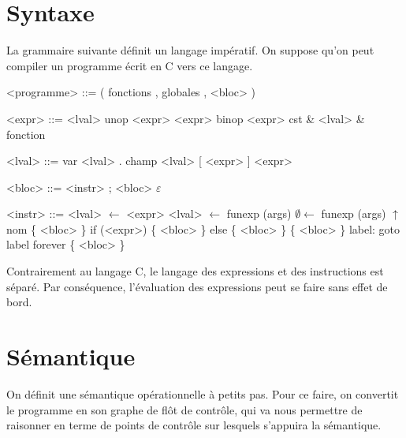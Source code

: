 \documentclass{article}
\begin{document}
\section{Syntaxe}

La grammaire suivante définit un langage impératif. On suppose qu'on peut
compiler un programme écrit en C vers ce langage.

\begin{grammarf}
<programme> ::= ( fonctions , globales , <bloc> )
\end{grammarf}
\begin{minipage}{0.4\textwidth}
\begin{grammarf}
    <expr> ::= <lval>
          \alt unop <expr>
          \alt <expr> binop <expr>
          \alt cst
          \alt \& <lval>
          \alt \& fonction

    <lval> ::= var
          \alt <lval> . champ
          \alt <lval> [ <expr> ]
          \alt * <expr>
\end{grammarf}
\end{minipage}
\begin{minipage}{0.4\textwidth}
\begin{grammarf}
     <bloc> ::= <instr> ; <bloc>
           \alt $ε$

    <instr> ::= <lval> $←$ <expr>
           \alt <lval> $←$ funexp (args)
           \alt  $∅ ←$ funexp (args)
           \alt $↑$ nom \{ <bloc> \}
           \alt if (<expr>) \{ <bloc> \} else \{ <bloc> \}
           \alt \{ <bloc> \} label:
           \alt goto label
           \alt forever \{ <bloc> \}
\end{grammarf}
\end{minipage}



Contrairement au langage C, le langage des expressions et des instructions est
séparé. Par conséquence, l'évaluation des expressions peut se faire sans effet de
bord.

\section{Sémantique}

On définit une sémantique opérationnelle à  petits pas. Pour ce faire, on
convertit le programme en son graphe de flôt de contrôle, qui va nous permettre
de raisonner en terme de points de contrôle sur lesquels s'appuira la
sémantique.
\end{document}
